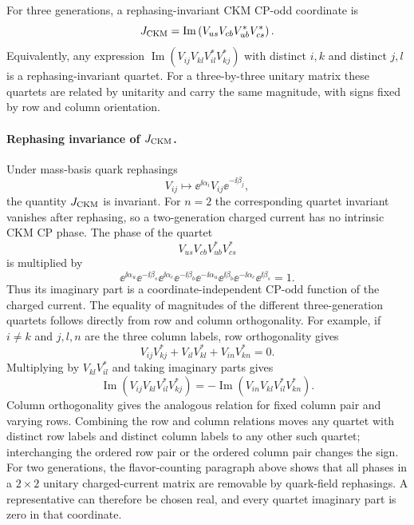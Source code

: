 \begin{definition}
\label{def:sm-jarlskog-invariant}
For three generations, a rephasing-invariant CKM CP-odd coordinate is
\[
  J_{\rm CKM}
  =
  \operatorname{Im}
  \left(
    V_{us}V_{cb}V_{ub}^*V_{cs}^*
  \right).
\]
Equivalently, any expression
\(\operatorname{Im}(V_{ij}V_{kl}V_{il}^*V_{kj}^*)\) with distinct
\(i,k\) and distinct \(j,l\) is a rephasing-invariant quartet.  For a
three-by-three unitary matrix these quartets are related by unitarity and
carry the same magnitude, with signs fixed by row and column orientation.
\end{definition}

\paragraph{Rephasing invariance of \(J_{\rm CKM}\).}
Under mass-basis quark rephasings
\[
  V_{ij}\longmapsto \ee^{\ii\alpha_i}V_{ij}\ee^{-\ii\beta_j},
\]
the quantity \(J_{\rm CKM}\) is invariant.  For \(n=2\) the corresponding
quartet invariant vanishes after rephasing, so a two-generation charged
current has no intrinsic CKM CP phase.
The phase of the quartet
\[
  V_{us}V_{cb}V_{ub}^*V_{cs}^*
\]
is multiplied by
\[
  \ee^{\ii\alpha_u}\ee^{-\ii\beta_s}
  \ee^{\ii\alpha_c}\ee^{-\ii\beta_b}
  \ee^{-\ii\alpha_u}\ee^{\ii\beta_b}
  \ee^{-\ii\alpha_c}\ee^{\ii\beta_s}=1 .
\]
Thus its imaginary part is a coordinate-independent CP-odd function of the
charged current.  The equality of magnitudes of the different three-generation
quartets follows directly from row and column orthogonality.  For example,
if \(i\neq k\) and \(j,l,n\) are the three column labels, row orthogonality
gives
\[
  V_{ij}V_{kj}^*+V_{il}V_{kl}^*+V_{in}V_{kn}^*=0 .
\]
Multiplying by \(V_{kl}V_{il}^*\) and taking imaginary parts gives
\[
  \operatorname{Im}(V_{ij}V_{kl}V_{il}^*V_{kj}^*)
  =
  -\operatorname{Im}(V_{in}V_{kl}V_{il}^*V_{kn}^*) .
\]
Column orthogonality gives the analogous relation for fixed column pair and
varying rows.  Combining the row and column relations moves any quartet with
distinct row labels and distinct column labels to any other such quartet;
interchanging the ordered row pair or the ordered column pair changes the
sign.  For two generations, the flavor-counting paragraph above shows that all
phases in a \(2\times2\) unitary charged-current matrix are removable by
quark-field rephasings.  A representative can therefore be chosen real, and
every quartet imaginary part is zero in that coordinate.

